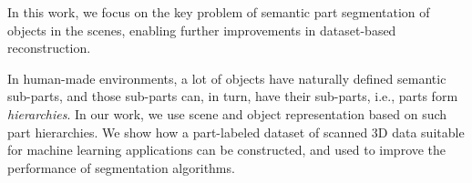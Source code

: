 



In this work, we focus on the key problem of semantic part segmentation of objects in the scenes, enabling further improvements in  dataset-based reconstruction. 


In human-made environments, a lot of objects have naturally defined semantic sub-parts, and those sub-parts can, in turn, have their sub-parts, i.e., parts form \emph{hierarchies}.  In our work, we use scene and object representation based on such part hierarchies.  We show how a part-labeled dataset of scanned 3D data suitable for machine learning applications can be constructed, and used to improve the performance of segmentation algorithms. 


